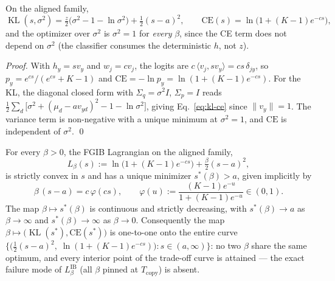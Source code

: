 \begin{lemma}\label{lem:lagrangian}
On the aligned family,
\begin{equation}
\operatorname{KL}(s, \sigma^2)
= \tfrac{z}{2}\big(\sigma^2 - 1 - \ln\sigma^2\big) + \tfrac{1}{2}(s-a)^2,
\qquad
\mathrm{CE}(s) = \ln\!\big(1 + (K-1)e^{-cs}\big),
\label{eq:kl-ce}
\end{equation}
and the optimizer over $\sigma^2$ is $\sigma^2 = 1$ for \emph{every} $\beta$, since the CE
term does not depend on $\sigma^2$ (the classifier consumes the deterministic $h$, not $z$).
\end{lemma}

\begin{proof}
With $h_y = s v_y$ and $w_j = c v_j$, the logits are $c\,\langle v_j, s v_y\rangle
= cs\,\delta_{jy}$, so $p_y = e^{cs}/(e^{cs} + K - 1)$ and
$\mathrm{CE} = -\ln p_y = \ln(1 + (K-1)e^{-cs})$.
For the KL, the diagonal closed form with $\Sigma_q = \sigma^2 I$, $\Sigma_p = I$ reads
$\tfrac{1}{2}\sum_d\big[\sigma^2 + (\mu_d - a v_{yd})^2 - 1 - \ln\sigma^2\big]$, giving
Eq.~\eqref{eq:kl-ce} since $\|v_y\| = 1$. The variance term is non-negative with a unique
minimum at $\sigma^2 = 1$, and $\mathrm{CE}$ is independent of $\sigma^2$. \hfill\qed
\end{proof}

\begin{proposition}\label{prop:sweep}
For every $\beta > 0$, the FGIB Lagrangian on the aligned family,
\begin{equation}
L_\beta(s) := \ln\!\big(1 + (K-1)e^{-cs}\big) + \tfrac{\beta}{2}(s-a)^2,
\label{eq:fgib-lag}
\end{equation}
is strictly convex in $s$ and has a unique minimizer $s^*(\beta) > a$, given implicitly by
\begin{equation}
\beta\,(s-a) = c\,\varphi(cs),
\qquad
\varphi(u) := \frac{(K-1)e^{-u}}{1 + (K-1)e^{-u}} \in (0,1) .
\label{eq:stationarity}
\end{equation}
The map $\beta \mapsto s^*(\beta)$ is continuous and strictly decreasing, with
$s^*(\beta) \to a$ as $\beta \to \infty$ and $s^*(\beta) \to \infty$ as $\beta \to 0$.
Consequently the map $\beta \mapsto \big(\operatorname{KL}(s^*), \mathrm{CE}(s^*)\big)$ is
one-to-one onto the entire curve $\{\big(\tfrac{1}{2}(s-a)^2,\;
\ln(1+(K-1)e^{-cs})\big) : s \in (a, \infty)\}$: no two $\beta$ share the same optimum, and
every interior point of the trade-off curve is attained --- the exact failure mode of
$L^{\mathrm{IB}}_\beta$ (all $\beta$ pinned at $T_{\mathrm{copy}}$) is absent.
\end{proposition}

